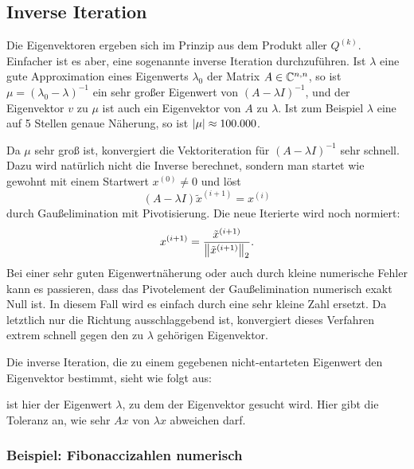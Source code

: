 \subsection{Inverse Iteration}

Die Eigenvektoren ergeben sich im Prinzip aus dem Produkt aller
$Q^{(k)}$. Einfacher ist es aber, eine sogenannte inverse Iteration
durchzuführen. Ist $\lambda$ eine gute Approximation eines Eigenwerts
$\lambda_0$ der Matrix $A\in\mathbb{C}^{n,n}$, so ist $\mu = (\lambda_0
-\lambda)^{-1}$ ein sehr großer Eigenwert von $(A-\lambda I)^{-1}$,
und der Eigenvektor $v$ zu $\mu$ ist auch ein Eigenvektor von $A$ zu
$\lambda$. Ist zum Beispiel $\lambda$ eine auf 5 Stellen genaue
Näherung, so ist $\left\lvert{\mu}\right\rvert\approx 100.000$.

Da $\mu$ sehr groß ist, konvergiert die Vektoriteration für
$(A-\lambda I)^{-1}$ sehr schnell. Dazu wird natürlich nicht die
Inverse berechnet, sondern man startet wie gewohnt mit einem Startwert
$x^{(0)}\neq 0$ und löst
\begin{equation}
  (A - \lambda I) \tilde{x}^{(i+1)} = x^{(i)}
\end{equation}
durch Gaußelimination mit Pivotisierung. Die neue Iterierte wird noch
normiert:
\begin{equation}
  x^{(i+1)} = \frac{\tilde{x}^{(i+1)}}{\left\lVert{\tilde{x}^{(i+1)}}\right\rVert_2}.
\end{equation}
Bei einer sehr guten Eigenwertnäherung oder auch durch kleine
numerische Fehler kann es passieren, dass das Pivotelement der
Gaußelimination numerisch exakt Null ist. In diesem Fall wird es
einfach durch eine sehr kleine Zahl ersetzt. Da letztlich nur die
Richtung ausschlaggebend ist, konvergiert dieses Verfahren extrem
schnell gegen den zu $\lambda$ gehörigen Eigenvektor.

Die inverse Iteration, die zu einem gegebenen nicht-entarteten
Eigenwert den Eigenvektor bestimmt, sieht wie folgt aus:

 ist hier der Eigenwert $\lambda$, zu dem der Eigenvektor
gesucht wird. Hier gibt die Toleranz an, wie sehr $Ax$ von $\lambda x$
abweichen darf.

\subsubsection{Beispiel: Fibonaccizahlen numerisch}

